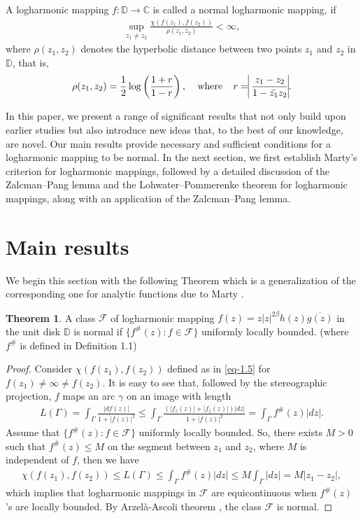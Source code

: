 \documentclass[a4paper,12pt]{amsart}
\theoremstyle{plain}
\theoremstyle{definition}
\newtheorem{thm}{Theorem}[section]
\begin{document}
A logharmonic mapping $f:\mathbb{D}\rightarrow\mathbb{C}$ is called a normal logharmonic mapping, if
\begin{align*}
	\sup_{z_1\neq z_2} \frac{\chi(f(z_1), f(z_2))}{\rho(z_1,z_2)} < \infty,
\end{align*}
where $\rho(z_1,z_2)$ denotes the hyperbolic distance between two points $z_1$ and $z_2$ in $\mathbb{D}$, that is,
\begin{align*}
	\rho(z_1,z_2)=\frac{1}{2}\log\left(\frac{1+r}{1-r}\right), \;\;\;\;
	\mbox{where}\;\;\;\; r=\vline\frac{z_1 -z_2}{1-\bar{z_1}z_2}\vline.
\end{align*}

In this paper, we present a range of significant results that not only build upon earlier studies but also introduce new ideas that, to the best of our knowledge, are novel. Our main results provide necessary and sufficient conditions for a logharmonic mapping to be normal. In the next section, we first establish Marty’s criterion for logharmonic mappings, followed by a detailed discussion of the Zalcman–Pang lemma and the Lohwater–Pommerenke theorem for logharmonic mappings, along with an application of the Zalcman–Pang lemma.


\section{\bf Main results}
 We begin this section with the following Theorem which is a generalization of the corresponding one for analytic functions due to Marty \cite[p. 226, Theorem 17]{Ahlfors-1979}.
\begin{thm}\label{th-2.1}
A class $\mathcal{F}$ of logharmonic mapping $f(z)=z|z|^{2\beta}h(z) \overline{g(z)}$ in the unit disk $\mathbb{D}$ is normal if $\{f^{\#}(z):f\in\mathcal{F}\}$ uniformly locally bounded. (where $f^{\#}$ is defined in Definition 1.1)
\end{thm}
\begin{proof}
Consider $\chi(f(z_1), f(z_2))$ defined as in \eqref{eq-1.5} for $f(z_1)\neq\infty\neq f(z_2)$. It is easy to see that, followed by the stereographic projection, $f$ maps an arc $\gamma$ on an
image with length
\begin{align*}
	L(\Gamma)=\int_{\Gamma} \frac{|df(z)|}{1+|f(z)|^2} \leq \int_{\Gamma} \frac{\left(|f_z(z)|+ |f_{\overline{z}}(z)| \right)|dz|} {1+|f(z)|^2}=\int_{\Gamma} f^{\#}(z) |dz|.
\end{align*}
Assume that $\{f^{\#}(z):f\in\mathcal{F}\}$ uniformly locally bounded. So, there exists $M>0$ such that $f^{\#}(z)\leq M$ on the segment between $z_1$ and $z_2$, where $M$ is independent of $f$, then we have
\begin{align*}
	\chi(f(z_1), f(z_2))\leq L(\Gamma)\leq \int_{\Gamma}f^{\#}(z) |dz|
	\leq M\int_{\Gamma} |dz|=M|z_1 -z_2|,
\end{align*}
which implies that logharmonic mappings in $\mathcal{F}$ are equicontinuous when $f^{\#}(z)$’s are locally bounded. By Arzelà-Ascoli theorem \cite[p. 222, Theorem 14]{Ahlfors-1979}, the class $\mathcal{F}$ is normal.
\end{proof}
\end{document}
